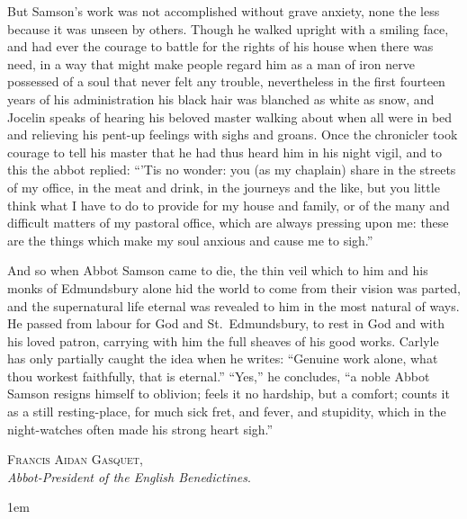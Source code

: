 \documentclass[10pt]{book}
\begin{document}
{{But Samson's work was not accomplished without grave anxiety, none the less because it was unseen by others. Though he walked upright with a smiling face, and had ever the courage to battle for the rights of his house when there was need, in a way that might make people regard him as a man of iron nerve possessed of a soul that never felt any trouble, nevertheless in the first fourteen years of his administration his black hair was blanched as white as snow, and Jocelin speaks of hearing his beloved master walking about when all were in bed and relieving his pent-up feelings with sighs and groans. Once the chronicler took courage to tell his master that he had thus heard him in his night vigil, and to this the abbot replied: ``'Tis no wonder: you (as my chaplain) share in the streets of my office, in the meat and drink, in the journeys and the like, but you little think what I have to do to provide for my house and family, or of the many and difficult matters of my pastoral office, which are always pressing upon me: these are the things which make my soul anxious and cause me to sigh.''

And so when Abbot Samson came to die, the thin veil which to him and his monks of Edmundsbury alone hid the world to come from their vision was parted, and the supernatural life eternal was revealed to him in the most natural of ways. He passed from labour for God and St.\ Edmundsbury, to rest in God and with his loved patron, carrying with him the full sheaves of his good works. Carlyle has only partially caught the idea when he writes: ``Genuine work alone, what thou workest faithfully, that is eternal.'' ``Yes,'' he concludes, ``a noble Abbot Samson resigns himself to oblivion; feels it no hardship, but a comfort; counts it as a still resting-place, for much sick fret, and fever, and stupidity, which in the night-watches often made his strong heart sigh.''
}
}


\begin{flushright}
\parbox{6cm}{
\begin{center}
\textsc{Francis Aidan Gasquet},\\
\vspace{0.1cm}
\emph{Abbot-President of the English Benedictines}.
\end{center}
}
\end{flushright}

\cleardoublepage
{}
\emergencystretch 1em
\end{document}
